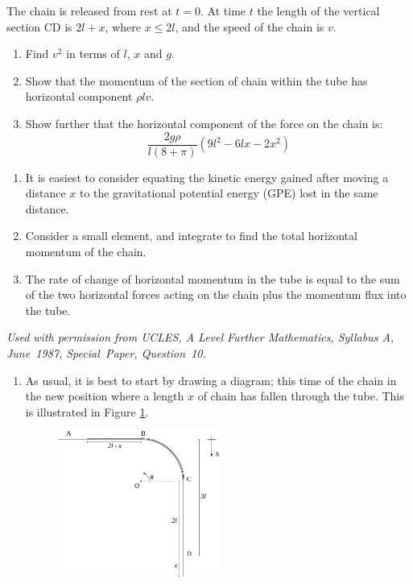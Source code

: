 \begin{problem}
{The chain is released from rest at $t=0$. At time $t$ the length of the vertical section CD is $2l + x$, where $x \le 2l$, and the speed of the chain is $v$.
\begin{enumerate}
	\item Find $v^{2}$ in terms of $l$, $x$ and $g$.
	\item Show that the momentum of the section of chain within the tube has horizontal component $\rho lv$.
	\item Show further that the horizontal component of the force on the chain is:
	\begin{equation*} \frac{2g \rho}{l(8 + \pi)} \left( 9l^{2} - 6lx - 2x^{2} \right) \end{equation*}
\end{enumerate}
}
{\begin{enumerate}
	\item It is easiest to consider equating the kinetic energy gained after moving a distance $x$ to the gravitational potential energy (GPE) lost in the same distance.
	\item Consider a small element, and integrate %
to find the total horizontal momentum of the chain.%
	\item The rate of change of horizontal momentum in the tube is equal to the sum of the two horizontal forces acting on the chain plus the momentum flux into the tube. 
\end{enumerate}
}
{\textit{Used with permission from UCLES, A Level Further Mathematics, Syllabus A, June~1987, Special~Paper, Question~10.}}
{\begin{enumerate}
	\item As usual, it is best to start by drawing a diagram; this time of the chain in the new position where a length $x$ of chain has fallen through the tube. This is illustrated in Figure \ref{fig:Dynamics_chain_sliding_labelled}.

\begin{figure}[h!]
\centering
\includegraphics[width=0.5\textwidth]{../../../figures/Dynamics_chain_sliding_labelled.svg}
\caption{}
\label{fig:Dynamics_chain_sliding_labelled}
\end{figure}


\end{enumerate}}
\end{problem}
